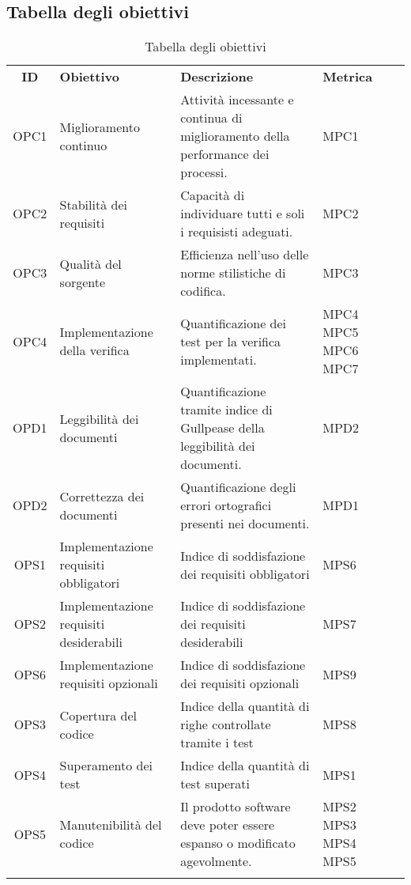 \subsection{Tabella degli obiettivi}

\begin{longtable}{| c | p{3cm} | p{5cm} | p{2cm} | p{3cm} |}
	\rowcolor{LightBlue}
	\color{white}\bfseries ID & \color{white}\bfseries Obiettivo & \color{white}\bfseries Descrizione & \color{white}\bfseries Metrica \\[0.25cm]
	OPC1 & Miglioramento continuo & Attività incessante e continua di miglioramento della performance dei processi. & MPC1\\ \hline
	OPC2 & Stabilità dei requisiti & Capacità di individuare tutti e soli i requisisti adeguati. & MPC2  \\ \hline
	OPC3 & Qualità del sorgente & Efficienza nell'uso delle norme stilistiche di codifica. & MPC3 \\ \hline
	OPC4 & Implementazione della verifica & Quantificazione dei test per la verifica implementati. & MPC4 \newline MPC5 \newline MPC6 \newline MPC7 \\ \hline
	OPD1 & Leggibilità dei documenti & Quantificazione tramite indice di Gullpease della leggibilità dei documenti. & MPD2 \\ \hline
	OPD2 & Correttezza dei documenti & Quantificazione degli errori ortografici presenti nei documenti. & MPD1  \\ \hline
	OPS1 & Implementazione requisiti obbligatori & Indice di soddisfazione dei requisiti obbligatori & MPS6 \\ \hline
	OPS2 & Implementazione requisiti desiderabili & Indice di soddisfazione dei requisiti desiderabili & MPS7 \\ \hline
	OPS6 & Implementazione requisiti opzionali & Indice di soddisfazione dei requisiti opzionali & MPS9 \\ \hline
	OPS3 & Copertura del codice & Indice della quantità di righe controllate tramite i test & MPS8 \\ \hline
	OPS4 & Superamento dei test & Indice della quantità di test superati & MPS1 \\ \hline
	OPS5 & Manutenibilità del codice & Il prodotto software deve poter essere espanso o modificato agevolmente. & MPS2 \newline MPS3 \newline MPS4 \newline MPS5\\ \hline 
	\caption{Tabella degli obiettivi} 
\end{longtable}
